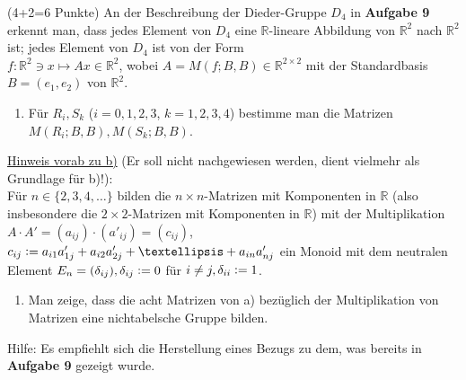 \documentclass{uebblatt}
\begin{document}
\begin{aufgabe}{ (4+2=6 Punkte)}
An der Beschreibung der Dieder-Gruppe $D_4$ in \textbf{Aufgabe 9} erkennt man, dass jedes Element von $D_4$ eine $\mathbb{R}$-lineare Abbildung von $\mathbb{R}^2$ nach $\mathbb{R}^2$ ist; jedes Element von $D_4$ ist von der Form\\
$f : \mathbb{R}^2 \ni x \mapsto Ax \in \mathbb{R}^2$, wobei $A = M(f; B, B) \in \mathbb{R}^{2 \times 2}$ mit der Standardbasis $B = (e_1, e_2)$ von $\mathbb{R}^2$.
\begin{enumerate}
\item Für $R_i, S_k$ ($i = 0, 1, 2, 3$, $k = 1, 2, 3, 4$) bestimme man die Matrizen $M(R_i; B, B), M(S_k; B, B)$.
\end{enumerate}
\underline{Hinweis vorab zu b)} (Er soll nicht nachgewiesen werden, dient vielmehr als Grundlage für b)!): \\
Für $n \in \{2, 3, 4, …\}$ bilden die $n \! \times \! n$-Matrizen mit Komponenten in $\mathbb{R}$ (also insbesondere die $2 \! \times \! 2$-Matrizen mit Komponenten in $\mathbb{R}$) mit der Multiplikation $A \cdot A' = (a_{ij}) \cdot (a'_{ij}) = (c_{ij})$, $c_{ij} \defeq a_{i1} a'_{1j} + a_{i2} a'_{2j} + … + a_{in} a'_{nj}$ ein Monoid mit dem neutralen Element $E_n = (\delta_{ij}), \delta_{ij} \vcentcolon= 0$ für $i \neq j, \delta_{ii} \vcentcolon= 1$. 
\begin{enumerate}[resume]
\item Man zeige, dass die acht Matrizen von a) bezüglich der Multiplikation von Matrizen eine nichtabelsche Gruppe bilden.
\end{enumerate}
Hilfe: Es empfiehlt sich die Herstellung eines Bezugs zu dem, was bereits in \textbf{Aufgabe 9} gezeigt wurde.
\end{aufgabe}

\newpage
\end{document}

